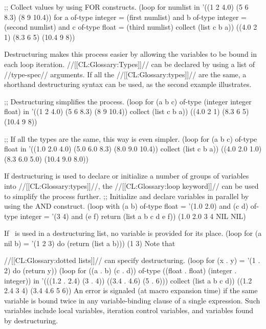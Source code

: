  \code ;; Collect values by using FOR constructs.
 (loop for numlist in '((1 2 4.0) (5 6 8.3) (8 9 10.4))
       for a of-type integer = (first numlist)
       and b of-type integer = (second numlist)
       and c of-type float = (third numlist)
       collect (list c b a)) \EV ((4.0 2 1) (8.3 6 5) (10.4 9 8)) \endcode

  Destructuring makes this process easier by allowing the variables to be bound in each loop iteration.   //[[CL:Glossary:Types]]// can be declared by using a  list of //type-spec// arguments.  If  all the //[[CL:Glossary:types]]// are the same, a shorthand destructuring syntax can be used, as the second example illustrates.

\code ;; Destructuring simplifies the process.
 (loop for (a b c) of-type (integer integer float) in
       '((1 2 4.0) (5 6 8.3) (8 9 10.4))
       collect (list c b a)) \EV ((4.0 2 1) (8.3 6 5) (10.4 9 8))
 

;; If all the types are the same, this way is even simpler.
 (loop for (a b c) of-type float in
       '((1.0 2.0 4.0) (5.0 6.0 8.3) (8.0 9.0 10.4))
       collect (list c b a)) \EV ((4.0 2.0 1.0) (8.3 6.0 5.0) (10.4 9.0 8.0)) \endcode
 
 
  If destructuring is used to declare or initialize a number of groups of variables into //[[CL:Glossary:types]]//, the //[[CL:Glossary:loop keyword]]//  can be used to simplify the process further.   \code ;; Initialize and declare variables in parallel by using the AND construct.\kern-7pt
 (loop with (a b) of-type float = '(1.0 2.0)
       and (c d) of-type integer = '(3 4)
       and (e f)
       return (list a b c d e f)) \EV (1.0 2.0 3 4 NIL NIL) \endcode

 
  If \nil\ is used in a destructuring list, no variable is provided for its place.
  \code
 (loop for (a nil b) = '(1 2 3)
       do (return (list a b))) \EV (1 3) \endcode
  Note that 

//[[CL:Glossary:dotted lists]]// can specify destructuring.
  \code
 (loop for (x . y) = '(1 . 2)
       do (return y)) 
 (loop for ((a . b) (c . d)) of-type ((float . float) (integer . integer)) in
       '(((1.2 . 2.4) (3 . 4)) ((3.4 . 4.6) (5 . 6)))
       collect (list a b c d)) \EV ((1.2 2.4 3 4) (3.4 4.6 5 6)) \endcode
  An error  is signaled (at macro expansion time) if the same variable is bound twice in any variable-binding clause of a single  expression.  Such variables include local variables, iteration control variables, and variables found by destructuring.

